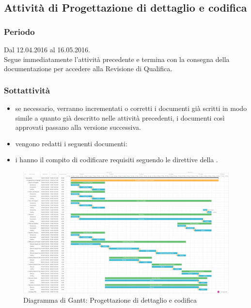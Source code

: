 \documentclass[a4paper, titlepage]{article}
\begin{document}
	\subsection{Attività di Progettazione di dettaglio e codifica }
	\subsubsection{Periodo}
	Dal 12.04.2016 al 16.05.2016.\\
	Segue immediatamente l'attività precedente e termina con la consegna della documentazione per accedere alla Revisione di Qualifica.
	
	
	\subsubsection{Sottattività}
	\begin{itemize}
		\item {} se necessario, verranno incrementati o corretti i documenti già scritti in modo simile a quanto già descritto nelle attività precedenti, i documenti così approvati passano alla versione successiva.
		\item {} vengono redatti i seguenti documenti:
		\item {} i  hanno il compito di codificare  requisiti seguendo le direttive della .		 
	\end{itemize}
	
	\newpage
	\begin{figure}[!ht]
		\includegraphics[scale=0.25]{Img/Grafici_Gantt/Progettazione(dett-cod).pdf}
		\caption{ Diagramma di Gantt: Progettazione di dettaglio e codifica}
	\end{figure}
	
\end{document}
